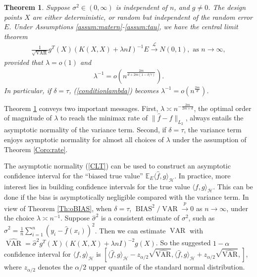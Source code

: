\documentclass[12pt]{article}
\theoremstyle{plain}
\newtheorem{theorem}{Theorem}
\theoremstyle{remark}
\begin{document}
\begin{theorem}\label{Th:AN}
Suppose $\sigma^2\in(0,\infty)$ is independent of $n$, and $g\neq 0$. The design points $X$ are either deterministic, or random but independent of the random error $E$.
    Under Assumptions \ref{assum:matern}-\ref{assum:tau}, we have the central limit theorem
   \begin{eqnarray}\label{CLT}
       \frac{1}{\sqrt{\operatorname{VAR}}}g^T(X)(K(X,X)+\lambda n I)^{-1}E\xrightarrow{\mathscr{L}} N(0,1),  \text{ as } n\rightarrow\infty,
   \end{eqnarray} 
   provided that $\lambda=o(1)$ and
    \begin{eqnarray}\label{conditionlambda}
        \lambda^{-1}=o\left(n^{\frac{2m}{d+2m(1-\delta/\tau)}}\right).
    \end{eqnarray}
    In particular, if $\delta=\tau$, (\ref{conditionlambda}) becomes $\lambda^{-1}=o(n^{\frac{2m}{d}})$.
\end{theorem}

Theorem \ref{Th:AN} conveys two important messages. First, $\lambda\asymp n^{-\frac{2m}{2m+d}}$, the optimal order of magnitude of $\lambda$ to reach the minimax rate of $\|\hat{f}-f\|_{L_2}$, always entails the asymptotic normality of the variance term. Second, if $\delta=\tau$, the variance term enjoys asymptotic normality for almost all choices of $\lambda$ under the assumption of Theorem \ref{Coro:rate}.

The asymptotic normality (\ref{CLT}) can be used to construct an asymptotic confidence interval for the ``biased true value'' $\mathbb{E}_E\langle \hat{f},g\rangle_\mathcal{H}$. In practice, more interest lies in building confidence intervals for the true value $\langle {f},g\rangle_\mathcal{H}$. This can be done if the bias is asymptotically negligible compared with the variance term. In view of Theorem \ref{Th:oBIAS}, when $\delta=\tau$, $\operatorname{BIAS}^2/{\operatorname{VAR}}\xrightarrow{p} 0$ as $n\rightarrow \infty$, under the choice $\lambda\asymp n^{-1}$. Suppose $\hat{\sigma}^2$ is a consistent estimate of $\sigma^2$, such as 
$\hat{\sigma}^2=\frac{1}{n}\sum_{i=1}^n(y_i-\hat{f}(x_i))^2$.
Then we can estimate $\operatorname{VAR}$ with
$\widehat{\operatorname{VAR}}=\hat{\sigma}^2g^T(X)(K(X,X)+\lambda n I)^{-2}g(X)$.
So the suggested $1-\alpha$ confidence interval for $\langle f,g\rangle_\mathcal{H}$ is
$\left[\langle \hat{f},g\rangle_\mathcal{H}-z_{\alpha/2}\sqrt{\widehat{\operatorname{VAR}}},\langle \hat{f},g\rangle_\mathcal{H}+z_{\alpha/2}\sqrt{\widehat{\operatorname{VAR}}},\right]$,
where $z_{\alpha/2}$ denotes the $\alpha/2$ upper quantile of the standard normal distribution.
\end{document}
